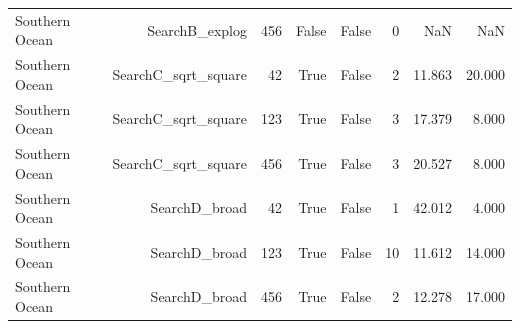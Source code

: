 \begin{longtable}{lrrrrrrr}
Southern Ocean & SearchB\_explog & 456 & False & False & 0 & NaN & NaN \\
Southern Ocean & SearchC\_sqrt\_square & 42 & True & False & 2 & 11.863 & 20.000 \\
Southern Ocean & SearchC\_sqrt\_square & 123 & True & False & 3 & 17.379 & 8.000 \\
Southern Ocean & SearchC\_sqrt\_square & 456 & True & False & 3 & 20.527 & 8.000 \\
Southern Ocean & SearchD\_broad & 42 & True & False & 1 & 42.012 & 4.000 \\
Southern Ocean & SearchD\_broad & 123 & True & False & 10 & 11.612 & 14.000 \\
Southern Ocean & SearchD\_broad & 456 & True & False & 2 & 12.278 & 17.000 \\
\end{longtable}
